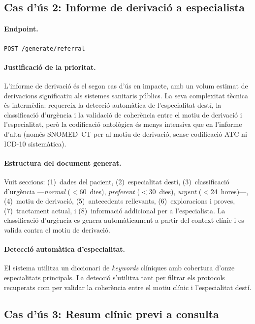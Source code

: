 \documentclass[CAT]{TFUOC}%
\begin{document}
\subsection{Cas d'ús 2: Informe de derivació a especialista}

\paragraph{Endpoint.} \texttt{POST /generate/referral}

\paragraph{Justificació de la prioritat.} L'informe de derivació és el segon cas d'ús en impacte, amb un volum estimat de derivacions significatiu als sistemes sanitaris públics. La seva complexitat tècnica és intermèdia: requereix la detecció automàtica de l'especialitat destí, la classificació d'urgència i la validació de coherència entre el motiu de derivació i l'especialitat, però la codificació ontològica és menys intensiva que en l'informe d'alta (només SNOMED~CT per al motiu de derivació, sense codificació ATC ni ICD-10 sistemàtica).

\paragraph{Estructura del document generat.} Vuit seccions: (1)~dades del pacient, (2)~especialitat destí, (3)~classificació d'urgència ---\textit{normal} ($<$60~dies), \textit{preferent} ($<$30~dies), \textit{urgent} ($<$24~hores)---, (4)~motiu de derivació, (5)~antecedents rellevants, (6)~exploracions i proves, (7)~tractament actual, i (8)~informació addicional per a l'especialista. La classificació d'urgència es genera automàticament a partir del context clínic i es valida contra el motiu de derivació.

\paragraph{Detecció automàtica d'especialitat.} El sistema utilitza un diccionari de \textit{keywords} clíniques amb cobertura d'onze especialitats principals. La detecció s'utilitza tant per filtrar els protocols recuperats com per validar la coherència entre el motiu clínic i l'especialitat destí.

\subsection{Cas d'ús 3: Resum clínic previ a consulta}
\end{document}
